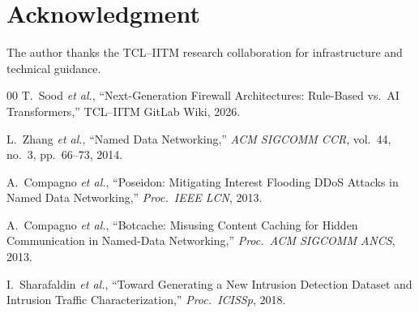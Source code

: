 \documentclass[10pt,conference]{IEEEtran}
\begin{document}
\section*{Acknowledgment}
The author thanks the TCL--IITM research collaboration for
infrastructure and technical guidance.

\begin{thebibliography}{00}
T.~Sood \textit{et al.},
``Next-Generation Firewall Architectures: Rule-Based vs.\ AI
Transformers,'' TCL--IITM GitLab Wiki, 2026.

L.~Zhang \textit{et al.},
``Named Data Networking,''
\emph{ACM SIGCOMM CCR}, vol.~44, no.~3, pp.~66--73, 2014.

A.~Compagno \textit{et al.},
``Poseidon: Mitigating Interest Flooding DDoS Attacks in Named Data
Networking,'' \emph{Proc.\ IEEE LCN}, 2013.

A.~Compagno \textit{et al.},
``Botcache: Misusing Content Caching for Hidden Communication in
Named-Data Networking,'' \emph{Proc.\ ACM SIGCOMM ANCS}, 2013.

I.~Sharafaldin \textit{et al.},
``Toward Generating a New Intrusion Detection Dataset and Intrusion
Traffic Characterization,'' \emph{Proc.\ ICISSp}, 2018.
\end{thebibliography}
\end{document}
